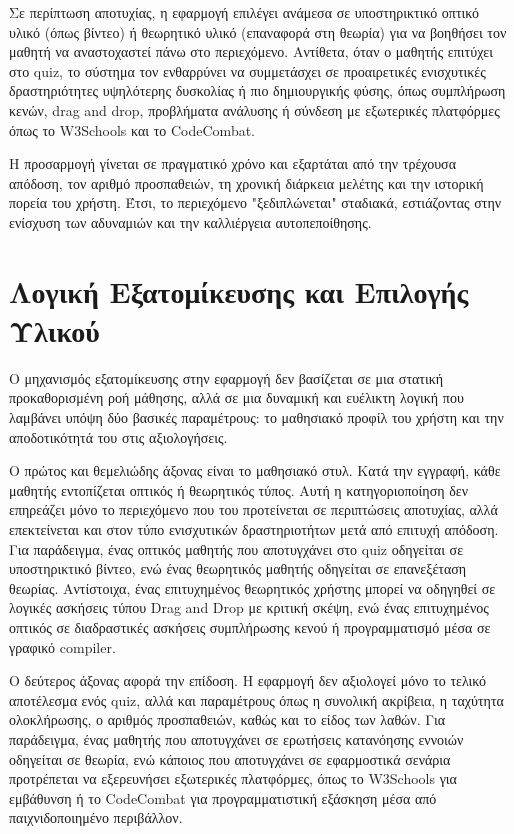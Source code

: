 \documentclass[11pt]{report}
\begin{document}
Σε περίπτωση αποτυχίας, η εφαρμογή επιλέγει ανάμεσα σε υποστηρικτικό οπτικό υλικό (όπως βίντεο) ή θεωρητικό υλικό (επαναφορά στη θεωρία) για να βοηθήσει τον μαθητή να αναστοχαστεί πάνω στο περιεχόμενο. Αντίθετα, όταν ο μαθητής επιτύχει στο quiz, το σύστημα τον ενθαρρύνει να συμμετάσχει σε προαιρετικές ενισχυτικές δραστηριότητες υψηλότερης δυσκολίας ή πιο δημιουργικής φύσης, όπως συμπλήρωση κενών, drag and drop, προβλήματα ανάλυσης ή σύνδεση με εξωτερικές πλατφόρμες όπως το W3Schools και το CodeCombat. 

Η προσαρμογή γίνεται σε πραγματικό χρόνο και εξαρτάται από την τρέχουσα απόδοση, τον αριθμό προσπαθειών, τη χρονική διάρκεια μελέτης και την ιστορική πορεία του χρήστη. Έτσι, το περιεχόμενο "ξεδιπλώνεται" σταδιακά, εστιάζοντας στην ενίσχυση των αδυναμιών και την καλλιέργεια αυτοπεποίθησης. 

\section{Λογική Εξατομίκευσης και Επιλογής Υλικού}

Ο μηχανισμός εξατομίκευσης στην εφαρμογή δεν βασίζεται σε μια στατική προκαθορισμένη ροή μάθησης, αλλά σε μια δυναμική και ευέλικτη λογική που λαμβάνει υπόψη δύο βασικές παραμέτρους: το μαθησιακό προφίλ του χρήστη και την αποδοτικότητά του στις αξιολογήσεις. 

Ο πρώτος και θεμελιώδης άξονας είναι το μαθησιακό στυλ. Κατά την εγγραφή, κάθε μαθητής εντοπίζεται οπτικός ή θεωρητικός τύπος. Αυτή η κατηγοριοποίηση δεν επηρεάζει μόνο το περιεχόμενο που του προτείνεται σε περιπτώσεις αποτυχίας, αλλά επεκτείνεται και στον τύπο ενισχυτικών δραστηριοτήτων μετά από επιτυχή απόδοση. Για παράδειγμα, ένας οπτικός μαθητής που αποτυγχάνει στο quiz οδηγείται σε υποστηρικτικό βίντεο, ενώ ένας θεωρητικός μαθητής οδηγείται σε επανεξέταση θεωρίας. Αντίστοιχα, ένας επιτυχημένος θεωρητικός χρήστης μπορεί να οδηγηθεί σε λογικές ασκήσεις τύπου Drag and Drop με κριτική σκέψη, ενώ ένας επιτυχημένος οπτικός σε διαδραστικές ασκήσεις συμπλήρωσης κενού ή προγραμματισμό μέσα σε γραφικό compiler. 

Ο δεύτερος άξονας αφορά την επίδοση. Η εφαρμογή δεν αξιολογεί μόνο το τελικό αποτέλεσμα ενός quiz, αλλά και παραμέτρους όπως η συνολική ακρίβεια, η ταχύτητα ολοκλήρωσης, ο αριθμός προσπαθειών, καθώς και το είδος των λαθών. Για παράδειγμα, ένας μαθητής που αποτυγχάνει σε ερωτήσεις κατανόησης εννοιών οδηγείται σε θεωρία, ενώ κάποιος που αποτυγχάνει σε εφαρμοστικά σενάρια προτρέπεται να εξερευνήσει εξωτερικές πλατφόρμες, όπως το W3Schools για εμβάθυνση ή το CodeCombat για προγραμματιστική εξάσκηση μέσα από παιχνιδοποιημένο περιβάλλον. 
\end{document}
